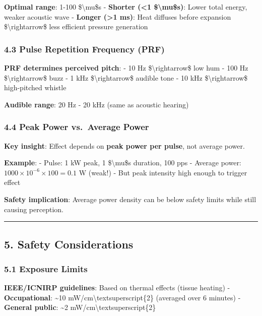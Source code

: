 \textbf{Optimal range}: 1-100 \$\textbackslash mu\$s - \textbf{Shorter
(\textless1 \$\textbackslash mu\$s)}: Lower total energy, weaker
acoustic wave - \textbf{Longer (\textgreater1 ms)}: Heat diffuses before
expansion \$\textbackslash rightarrow\$ less efficient pressure
generation

\subsubsection{4.3 Pulse Repetition Frequency
(PRF)}\label{pulse-repetition-frequency-prf}

\textbf{PRF determines perceived pitch}: - 10 Hz
\$\textbackslash rightarrow\$ low hum - 100 Hz
\$\textbackslash rightarrow\$ buzz - 1 kHz \$\textbackslash rightarrow\$
audible tone - 10 kHz \$\textbackslash rightarrow\$ high-pitched whistle

\textbf{Audible range}: 20 Hz - 20 kHz (same as acoustic hearing)

\subsubsection{4.4 Peak Power vs.~Average
Power}\label{peak-power-vs.-average-power}

\textbf{Key insight}: Effect depends on \textbf{peak power per pulse},
not average power.

\textbf{Example}: - Pulse: 1 kW peak, 1 \$\textbackslash mu\$s duration,
100 pps - Average power: \(1000 \times 10^{-6} \times 100 = 0.1\) W
(weak!) - But peak intensity high enough to trigger effect

\textbf{Safety implication}: Average power density can be below safety
limits while still causing perception.

\begin{center}\rule{0.5\linewidth}{0.5pt}\end{center}

\subsection{5. Safety Considerations}\label{safety-considerations}

\subsubsection{5.1 Exposure Limits}\label{exposure-limits}

\textbf{IEEE/ICNIRP guidelines}: Based on thermal effects (tissue
heating) - \textbf{Occupational}: \textasciitilde10
mW/cm\textbackslash textsuperscript\{2\} (averaged over 6 minutes) -
\textbf{General public}: \textasciitilde2
mW/cm\textbackslash textsuperscript\{2\}

